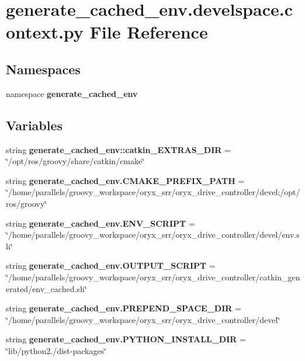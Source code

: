 \section{generate\-\_\-cached\-\_\-env.\-develspace.\-context.\-py \-File \-Reference}
\label{generate__cached__env_8develspace_8context_8py}
\subsection*{\-Namespaces}
\begin{DoxyCompactItemize}
\item 
namespace {\bf generate\-\_\-cached\-\_\-env}
\end{DoxyCompactItemize}
\subsection*{\-Variables}
\begin{DoxyCompactItemize}
\item 
string {\bf generate\-\_\-cached\-\_\-env\-::catkin\-\_\-\-E\-X\-T\-R\-A\-S\-\_\-\-D\-I\-R} = \char`\"{}/opt/ros/groovy/share/catkin/cmake\char`\"{}
\item 
string {\bf generate\-\_\-cached\-\_\-env.\-C\-M\-A\-K\-E\-\_\-\-P\-R\-E\-F\-I\-X\-\_\-\-P\-A\-T\-H} = \char`\"{}/home/parallels/groovy\-\_\-workspace/oryx\-\_\-srr/oryx\-\_\-drive\-\_\-controller/devel;/opt/ros/groovy\char`\"{}
\item 
string {\bf generate\-\_\-cached\-\_\-env.\-E\-N\-V\-\_\-\-S\-C\-R\-I\-P\-T} = \char`\"{}/home/parallels/groovy\-\_\-workspace/oryx\-\_\-srr/oryx\-\_\-drive\-\_\-controller/devel/env.\-sh\char`\"{}
\item 
string {\bf generate\-\_\-cached\-\_\-env.\-O\-U\-T\-P\-U\-T\-\_\-\-S\-C\-R\-I\-P\-T} = \char`\"{}/home/parallels/groovy\-\_\-workspace/oryx\-\_\-srr/oryx\-\_\-drive\-\_\-controller/catkin\-\_\-generated/env\-\_\-cached.\-sh\char`\"{}
\item 
string {\bf generate\-\_\-cached\-\_\-env.\-P\-R\-E\-P\-E\-N\-D\-\_\-\-S\-P\-A\-C\-E\-\_\-\-D\-I\-R} = \char`\"{}/home/parallels/groovy\-\_\-workspace/oryx\-\_\-srr/oryx\-\_\-drive\-\_\-controller/devel\char`\"{}
\item 
string {\bf generate\-\_\-cached\-\_\-env.\-P\-Y\-T\-H\-O\-N\-\_\-\-I\-N\-S\-T\-A\-L\-L\-\_\-\-D\-I\-R} = \char`\"{}lib/python2./dist-\/packages\char`\"{}
\end{DoxyCompactItemize}
